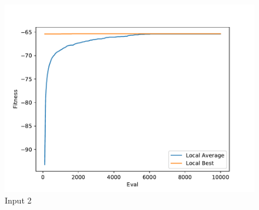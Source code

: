 \documentclass{standalone}
\begin{document}
\begin{figure}[!htb]
	\caption{Input 2}
	\label{fig:graph_2021}
	\includegraphics[width=\textwidth]{../graphs/graphs/2021.pdf}
\end{figure}
\end{document}
